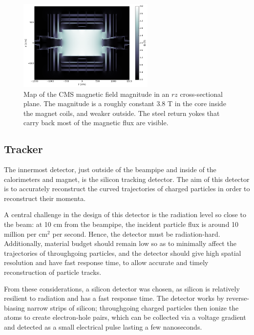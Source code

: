 \begin{figure}[t]
  \begin{center}
    \includegraphics[width=0.60\textwidth]{figs/cms/cms_bfield_coarse.png}
    \caption{Map of the CMS magnetic field magnitude in an $rz$ cross-sectional plane.
      The magnitude is a roughly constant 3.8 T in the core inside the magnet coils, and weaker outside.
      The steel return yokes that carry back most of the magnetic flux are visible.
            }
    \label{fig:cms_bfield}
  \end{center}
\end{figure}

\subsection{Tracker}

The innermost detector, just outside of the beampipe and inside of the calorimeters and magnet,
is the silicon tracking detector. The aim of this detector is to accurately reconstruct the curved
trajectories of charged particles in order to reconstruct their momenta. 

A central challenge in the design of this detector is the radiation level so close to the beam: 
at 10 cm from the beampipe, the incident particle flux is around 10 million per cm$^2$ per second.
Hence, the detector must be radiation-hard. Additionally, material budget should remain
low so as to minimally affect the trajectories of throughgoing particles, and the detector
should give high spatial resolution and have fast response time, to allow accurate and timely
reconstruction of particle tracks.

From these considerations, a silicon detector was chosen, as silicon is relatively resilient
to radiation and has a fast response time. The detector works by reverse-biasing narrow
strips of silicon; throughgoing charged particles then ionize the atoms to create
electron-hole pairs, which can be collected via a voltage gradient and detected
as a small electrical pulse lasting a few nanoseconds.

